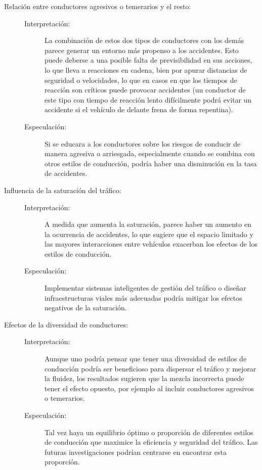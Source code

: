 \begin{description}
    \item[Relación entre conductores agresivos o temerarios y el resto:] \phantom{-}
    \begin{description}
        \item[Interpretación:] La combinación de estos dos tipos de conductores con los demás parece generar un entorno más propenso a los accidentes.
        Esto puede deberse a una posible falta de previsibilidad en sus acciones, lo que lleva a reacciones en cadena, bien por apurar distancias de seguridad o velocidades,
        lo que en casos en que los tiempos de reacción son críticos puede provocar accidentes (un conductor de este tipo con tiempo de reacción lento 
        difícilmente podrá evitar un accidente si el vehículo de delante frena de forma repentina).
        \item[Especulación:] Si se educara a los conductores sobre los riesgos de conducir de manera agresiva o arriesgada,
        especialmente cuando se combina con otros estilos de conducción, podría haber una disminución en la tasa de accidentes.
    \end{description}

    \item[Influencia de la saturación del tráfico:] \phantom{-}
    \begin{description}
        \item[Interpretación:] A medida que aumenta la saturación, parece haber un aumento en la ocurrencia de accidentes,
        lo que sugiere que el espacio limitado y las mayores interacciones entre vehículos exacerban los efectos de los estilos de conducción.
        \item[Especulación:] Implementar sistemas inteligentes de gestión del tráfico o diseñar infraestructuras viales más adecuadas podría mitigar los efectos negativos de la saturación.
    \end{description}

    \item[Efectos de la diversidad de conductores:] \phantom{-}
    \begin{description}
        \item[Interpretación:] Aunque uno podría pensar que tener una diversidad de estilos de conducción podría ser beneficioso para dispersar el tráfico y mejorar la fluidez,
        los resultados sugieren que la mezcla incorrecta puede tener el efecto opuesto, por ejemplo al incluir conductores agresivos o temerarios.
        \item[Especulación:] Tal vez haya un equilibrio óptimo o proporción de diferentes estilos de conducción que maximice la eficiencia y seguridad del tráfico.
        Las futuras investigaciones podrían centrarse en encontrar esta proporción.
    \end{description}


\end{description}
